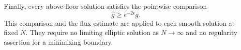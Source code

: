 Finally, every above-floor solution satisfies the pointwise comparison
\begin{equation}
 \widehat g\geq e^{-2\epsilon}g.
 \label{eq:scalar:metric-domination}
\end{equation}
This comparison and the flux estimate are applied to each smooth
solution at fixed $N$.  They require no limiting elliptic solution as
$N\to\infty$ and no regularity assertion for a minimizing boundary.
